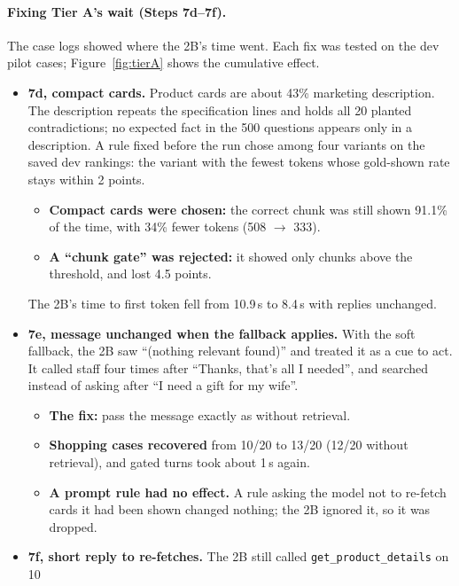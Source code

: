 \documentclass[11pt,a4paper]{article}
\begin{document}
\paragraph{Fixing Tier A's wait (Steps 7d--7f).} The case logs showed where the 2B's time went. Each fix was tested on
the dev pilot cases; Figure~\ref{fig:tierA} shows the cumulative effect.
\begin{itemize}
  \item \textbf{7d, compact cards.} Product cards are about 43\% marketing description. The description
        repeats the specification lines and holds all 20 planted contradictions; no expected fact in the 500 questions
        appears only in a description. A rule fixed before the run chose among four variants on the saved dev rankings:
        the variant with the fewest tokens whose gold-shown rate stays within 2 points.
        \begin{itemize}
          \item \textbf{Compact cards were chosen:} the correct chunk was still shown 91.1\% of the time, with 34\%
                fewer tokens (508 $\rightarrow$ 333).
          \item \textbf{A ``chunk gate'' was rejected:} it showed only chunks above the threshold, and lost 4.5 points.
        \end{itemize}
        The 2B's time to first token fell from 10.9\,s to 8.4\,s with replies unchanged.
  \item \textbf{7e, message unchanged when the fallback applies.} With the soft fallback, the 2B saw ``(nothing
        relevant found)'' and treated it as a cue to act. It called staff four times after ``Thanks, that's all I
        needed'', and searched instead of asking after ``I need a gift for my wife''.
        \begin{itemize}
          \item \textbf{The fix:} pass the message exactly as without retrieval.
          \item \textbf{Shopping cases recovered} from 10/20 to 13/20 (12/20 without retrieval), and gated turns took
                about 1\,s again.
          \item \textbf{A prompt rule had no effect.} A rule asking the model not to re-fetch cards it had been shown
                changed nothing; the 2B ignored it, so it was dropped.
        \end{itemize}
  \item \textbf{7f, short reply to re-fetches.} The 2B still called \texttt{get\_product\_details} on 10

\end{itemize}
\end{document}
